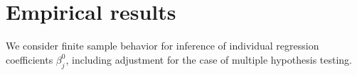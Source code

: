\documentclass[aos,MSNbibl,dvips]{arximspdf}
\newcommand{\eqref}[1]{(\ref{#1})}
\newcommand{\bx}{\mathbf{X}}
\begin{document}
%
%
%
%

\section{Empirical results}\label{empiricalsection}

We consider finite sample behavior for inference of individual regression
coefficients $\beta^0_j$, including adjustment for the case of multiple
hypothesis testing.
\end{document}
